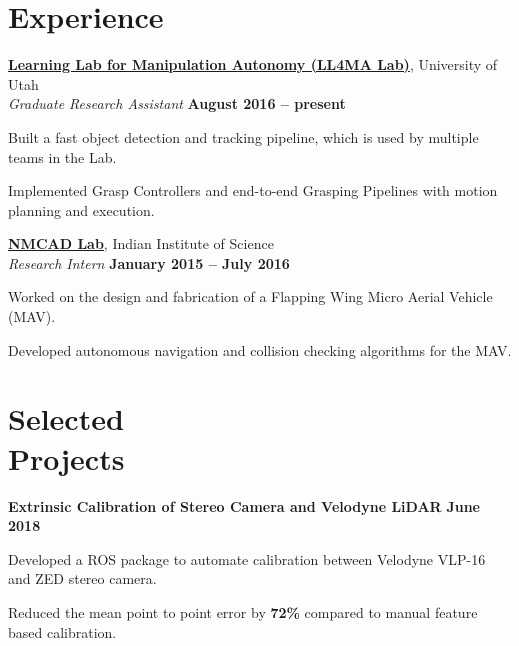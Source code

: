 \documentclass[letterpaper, margin, line, 10.5pt]{resume}
\begin{document}
\begin{resume}
    
    \sectionseperator
    \section{\myheadingstyle Experience}

    \href{https://robot-learning.cs.utah.edu}{\textbf{Learning Lab for Manipulation Autonomy (LL4MA Lab)}}, University of Utah \vspace{1pt}\\\vspace{1pt}%
    \textsl{Graduate Research Assistant} \hfill \textbf{August 2016 -- present}\\ \vspace{-4.5mm}
	\begin{list2}
		\item Built a fast object detection and tracking pipeline, which is used by multiple teams in the Lab.
		\item Implemented Grasp Controllers and end-to-end Grasping Pipelines with motion planning and execution.
	\end{list2}\vspace{-2.25mm}

    \href{http://www.aero.iisc.ernet.in/~dinesh/web/}{\textbf{NMCAD Lab}}, Indian Institute of Science \vspace{1pt}\\\vspace{1pt}%
    \textsl{Research Intern} \hfill \textbf{January 2015 -- July 2016}\\ \vspace{-4.5mm}
    \begin{list2}
    	\item Worked on the design and fabrication of a Flapping Wing Micro Aerial Vehicle (MAV).
    	\item Developed autonomous navigation and collision checking algorithms for the MAV.
    \end{list2}\vspace{-0.5mm}


    
	\sectionseperator
	\section{\myheadingstyle Selected \\ Projects}
	\textbf{Extrinsic Calibration of Stereo Camera and Velodyne LiDAR} \hfill \textbf{June 2018}
	\begin{list2}
		\item Developed a ROS package to automate calibration between Velodyne VLP-16 and ZED stereo camera.
		\item Reduced the mean point to point error by \textbf{72\%} compared to manual feature based calibration.
	\end{list2}\vspace{-3.2mm}
	

\end{resume}
\end{document}
